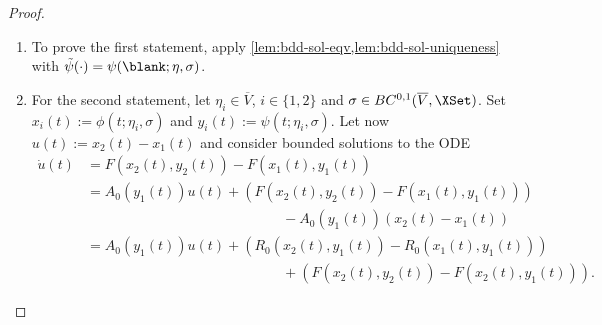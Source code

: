 \documentclass[a4paper]{siamart190516}
\begin{document}
\begin{proof}
\begin{enumerate}
\item To prove the first statement, apply
  \cref{lem:bdd-sol-eqv,lem:bdd-sol-uniqueness} with $\tilde{\psi}(\cdot) =
  \psi(\blank ; \eta, \sigma)$. 
\item For the second statement, let $\eta_i \in \overline{V}$, $i \in \{1,2\}$ and $\sigma \in BC^{0,1}(\overline{V},\XSet)$. Set $x_i(t) := \phi(t;\eta_i,\sigma)$ and $y_i(t) := \psi(t;\eta_i,\sigma)$. Let now $u(t):=x_2(t)-x_1(t)$ and consider bounded solutions to the ODE
\begin{align*}
\dot{u}(t) &= F(x_2(t),y_2(t)) - F(x_1(t),y_1(t)) \\
&= A_0(y_1(t)) u(t) + ( F(x_2(t),y_2(t)) - F(x_1(t),y_1(t)) ) \\
&\qquad \qquad \qquad \qquad \qquad \qquad \qquad - A_0(y_1(t)) (x_2(t)-x_1(t)) \\
&= A_0(y_1(t)) u(t) + (R_0(x_2(t),y_1(t)) - R_0(x_1(t),y_1(t)) ) \\
&\qquad \qquad \qquad \qquad \qquad \qquad \qquad +  (F(x_2(t),y_2(t)) - F(x_2(t),y_1(t)) ). 
\end{align*}


\end{enumerate}
\end{proof}
\end{document}
